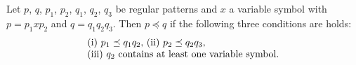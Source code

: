 \begin{thm}\label{Sato1:Lemma9}
    Let $p$, $q$, $p_{1}$, $p_{2}$, $q_{1}$, $q_{2}$, $q_{3}$ be regular patterns and $x$ a variable symbol with
    $p = p_{1}xp_{2}$ and $q = q_{1}q_{2}q_{3}$.
    Then $p \preceq q$ if the following three conditions are holds:
    \[
        \begin{tabular}{ll}
            $(\mathrm{i})$ $p_{1} \preceq q_{1}q_{2},$
            $(\mathrm{ii})$ $p_{2} \preceq q_{2}q_{3},$ \\
            $(\mathrm{iii})$ $q_{2}$ contains at least one variable symbol.
        \end{tabular}
    \]
\end{thm}


